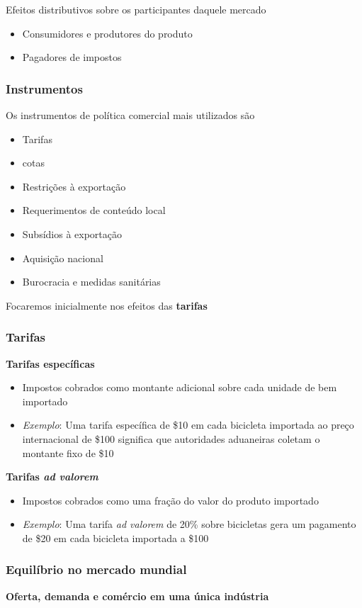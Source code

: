 \documentclass[a4paper,12pt]{article}[abntex2]
\begin{document}
Efeitos distributivos sobre os participantes daquele mercado
\begin{itemize}
  \item Consumidores e produtores do produto
  \item Pagadores de impostos
\end{itemize}

\subsubsection{\textbf{Instrumentos}}
Os instrumentos de política comercial mais utilizados são
\begin{itemize}
  \item Tarifas
  \item cotas
  \item Restrições à exportação
  \item Requerimentos de conteúdo local
  \item Subsídios à exportação
  \item Aquisição nacional
  \item Burocracia e medidas sanitárias
\end{itemize}

Focaremos inicialmente nos efeitos das \textbf{tarifas}

\subsubsection{\textbf{Tarifas}}
\textbf{Tarifas específicas}
\begin{itemize}
  \item Impostos cobrados como montante adicional sobre cada unidade de bem importado
  \item \textit{Exemplo}: Uma tarifa específica de \$10 em cada bicicleta importada ao preço internacional de \$100 significa que autoridades aduaneiras coletam o montante fixo de \$10
\end{itemize}

\textbf{Tarifas \textit{ad valorem}}
\begin{itemize}
  \item Impostos cobrados como uma fração do valor do produto importado
  \item \textit{Exemplo}: Uma tarifa \textit{ad valorem} de 20\% sobre bicicletas gera um pagamento de \$20 em cada bicicleta importada a \$100
\end{itemize}

\subsubsection{\textbf{Equilíbrio no mercado mundial}}
\textbf{Oferta, demanda e comércio em uma única indústria}
\end{document}
